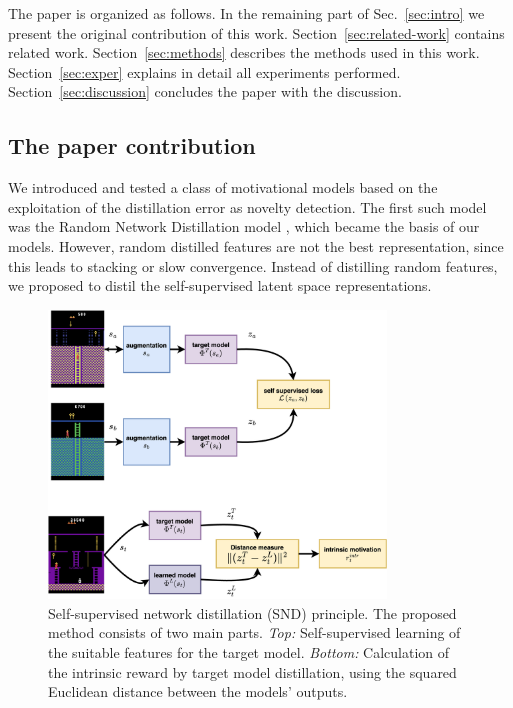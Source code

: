 \documentclass[a4paper,11pt]{elsarticle}
\begin{document}
The paper is organized as follows. In the remaining part of Sec.~\ref{sec:intro} we present the original contribution of this work. Section~\ref{sec:related-work} contains related work. Section~\ref{sec:methods} describes the methods used in this work. Section~\ref{sec:exper} explains in detail all experiments performed. Section~\ref{sec:discussion} concludes the paper with the discussion.

\subsection{The paper contribution}
We introduced and tested a class of motivational models based on the exploitation of the distillation error as novelty detection. The first such model was the Random Network Distillation model \cite{burda2018exploration}, which became the basis of our models. However, random distilled features are not the best representation, since this leads to stacking or slow convergence. Instead of distilling random features, we proposed to distil the self-supervised latent space representations. 

\begin{figure}[thb]
\centering
\includegraphics[width=0.8\textwidth]{fig/diagrams/cnd-overview.png}
\caption{Self-supervised network distillation (SND) principle. The proposed method consists of two main parts. {\it Top:} Self-supervised learning of the suitable features for the target model. {\it Bottom:} Calculation of the intrinsic reward by target model distillation, using the squared Euclidean distance between the models' outputs.}
\label{fig:cnd_overview}
\end{figure}
\end{document}
